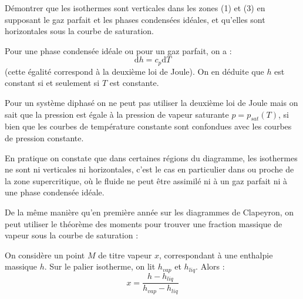 \documentclass[11pt,fleqn]{book} %
\newcommand{\dd}{\mathrm{d}}
\begin{document}
\begin{capex}
Démontrer que les isothermes sont verticales dans les zones (1) et (3) en supposant le gaz parfait et les phases condensées idéales, et qu'elles sont horizontales sous la courbe de saturation.
\end{capex}

\begin{solution}
Pour une phase condensée idéale ou pour un gaz parfait, on a :
\begin{equation}
    \dd h = c_p \dd T
\end{equation}
(cette égalité correspond à la deuxième loi de Joule). On en déduite que $h$ est constant si et seulement si $T$ est constante. 

Pour un système diphasé on ne peut pas utiliser la deuxième loi de Joule mais on sait que la pression est égale à la pression de vapeur saturante $p = p_{sat}(T)$, si bien que les courbes de température constante sont confondues avec les courbes de pression constante.

\end{solution}

\begin{remark}
    En pratique on constate que dans certaines régions du diagramme, les isothermes ne sont ni verticales ni horizontales, c'est le cas en particulier dans ou proche de la zone supercritique, où le fluide ne peut être assimilé ni à un gaz parfait ni à une phase condensée idéale.
\end{remark}

De la même manière qu'en première année sur les diagrammes de Clapeyron, on peut utiliser le théorème des moments pour trouver une fraction massique de vapeur sous la courbe de saturation :
\begin{proposition}
On considère un point $M$ de titre vapeur $x$, correspondant à une enthalpie massique $h$. Sur le palier isotherme, on lit $h_{vap}$ et $h_{liq}$. Alors :
\begin{equation}
    x = \frac{h-h_{liq}}{h_{vap}-h_{liq}}
\end{equation}
\end{proposition}
\end{document}
